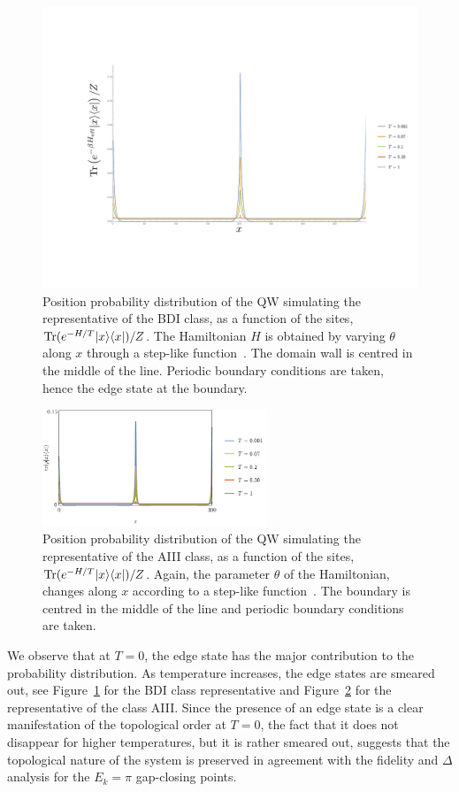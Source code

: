 \begin{figure}[h!]
\center
\includegraphics[scale=0.4]{edgestates_BDI}
\caption{
Position probability distribution of the QW simulating the representative of the BDI class, as a function of the sites, $\text{Tr} (e^{-H/T}| x \rangle\langle x |)/Z$. The Hamiltonian $H$ is obtained by varying $\theta$ along $x$ through a step-like function~\cite{kit:rud:ber:dem:10}. The domain wall is centred in the middle of the line. Periodic boundary conditions are taken, hence the edge state at the boundary.}
\label{fig:edgeBDI}
\end{figure}

\begin{figure}[h!]
\center
\includegraphics[width=0.6\textwidth,height=0.25\textwidth]{plot9.pdf}
\caption{Position probability distribution of the QW simulating the representative of the AIII class, as a function of the sites, $\text{Tr} (e^{-H/T}| x \rangle\langle x |)/Z$. Again, the parameter $\theta$ of the Hamiltonian, changes along $x$ according to a step-like function~\cite{kit:rud:ber:dem:10}. The boundary  is centred in the middle of the line and periodic boundary conditions are taken.}
\label{fig:edgeAIII}
\end{figure}


We observe that at $T=0$, the edge state has the major contribution to the probability distribution. As temperature increases, the edge states are smeared out, see Figure~\ref{fig:edgeBDI} for the BDI class representative and Figure~\ref{fig:edgeAIII} for the representative of the class AIII. Since the presence of an edge state is a clear manifestation of the topological order at $T=0$, the fact that it does not disappear for higher temperatures, but it is rather smeared out, suggests that the topological nature of the system is preserved in agreement with the fidelity and $\Delta$ analysis for the $E_k=\pi$ gap-closing points.

